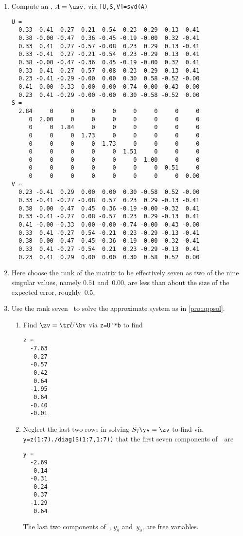 \begin{example}
\begin{solution}
\begin{enumerate}
\item Compute an \svd, \(A=\usv\), via \verb|[U,S,V]=svd(A)| \twodp
{\small
\begin{verbatim}
U =
  0.33 -0.41  0.27  0.21  0.54  0.23 -0.29  0.13 -0.41
  0.38 -0.00 -0.47  0.36 -0.45 -0.19 -0.00  0.32 -0.41
  0.33  0.41  0.27 -0.57 -0.08  0.23  0.29  0.13 -0.41
  0.33 -0.41  0.27 -0.21 -0.54  0.23 -0.29  0.13  0.41
  0.38 -0.00 -0.47 -0.36  0.45 -0.19 -0.00  0.32  0.41
  0.33  0.41  0.27  0.57  0.08  0.23  0.29  0.13  0.41
  0.23 -0.41 -0.29 -0.00  0.00  0.30  0.58 -0.52 -0.00
  0.41  0.00  0.33  0.00  0.00 -0.74 -0.00 -0.43  0.00
  0.23  0.41 -0.29 -0.00 -0.00  0.30 -0.58 -0.52  0.00
S =
  2.84     0     0     0     0     0     0     0     0
     0  2.00     0     0     0     0     0     0     0
     0     0  1.84     0     0     0     0     0     0
     0     0     0  1.73     0     0     0     0     0
     0     0     0     0  1.73     0     0     0     0
     0     0     0     0     0  1.51     0     0     0
     0     0     0     0     0     0  1.00     0     0
     0     0     0     0     0     0     0  0.51     0
     0     0     0     0     0     0     0     0  0.00
V =
  0.23 -0.41  0.29  0.00  0.00  0.30 -0.58  0.52 -0.00
  0.33 -0.41 -0.27 -0.08  0.57  0.23  0.29 -0.13 -0.41
  0.38  0.00  0.47  0.45  0.36 -0.19 -0.00 -0.32  0.41
  0.33 -0.41 -0.27  0.08 -0.57  0.23  0.29 -0.13  0.41
  0.41 -0.00 -0.33  0.00 -0.00 -0.74 -0.00  0.43 -0.00
  0.33  0.41 -0.27  0.54 -0.21  0.23 -0.29 -0.13 -0.41
  0.38  0.00  0.47 -0.45 -0.36 -0.19  0.00 -0.32 -0.41
  0.33  0.41 -0.27 -0.54  0.21  0.23 -0.29 -0.13  0.41
  0.23  0.41  0.29  0.00  0.00  0.30  0.58  0.52  0.00
\end{verbatim}
}%

\item Here choose the rank of the matrix to be effectively seven as two of the nine singular values, namely \(0.51\) and~\(0.00\), are less than about the size of the expected error, roughly~\(0.5\).

\item Use the rank seven \svd\ to solve the approximate system as in \autoref{pro:appsol}.
\begin{enumerate}
\item Find \(\zv=\tr U\bv\) via \verb|z=U'*b| to find
\begin{verbatim}
z =
  -7.63
   0.27
  -0.57
   0.42
   0.64
  -1.95
   0.64
  -0.40
  -0.01
\end{verbatim}

\item Neglect the last two rows in solving \(S_7\yv=\zv\) to find via
\verb|y=z(1:7)./diag(S(1:7,1:7))| that the first seven components of~\yv\ are
\begin{verbatim}
y =
  -2.69
   0.14
  -0.31
   0.24
   0.37
  -1.29
   0.64
\end{verbatim}
The last two components of~\yv, \(y_8\) and~\(y_9\), are free variables.


\end{enumerate}
\end{enumerate}
\end{solution}
\end{example}
